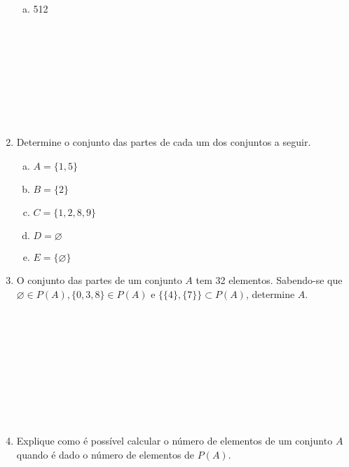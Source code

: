 \documentclass[a4paper,14pt]{article}
\begin{document}
\begin{multicols}{2}
\begin{enumerate}
\begin{enumerate}[a)]
   				\item 512 \\\\\\\\\\\\\\\\\\
   			\end{enumerate}
   			\item Determine o conjunto das partes de cada um dos conjuntos a seguir.
   			\begin{enumerate}[a)]
   				\item $A = \{1, 5\}$
   				\item $B = \{2\}$
   				\item $C = \{1, 2, 8, 9\}$
   				\item $D = \varnothing$
   				\item $E = \{\varnothing\}$
   			\end{enumerate}
   			\item O conjunto das partes de um conjunto $A$ tem 32 elementos. Sabendo-se que $\varnothing \in P(A), \{0, 3, 8\} \in P(A)$ e $\{\{4\},\{7\}\} \subset P(A)$, determine $A$. \\\\\\\\\\\\\\\\\\\\
   			\item Explique como é possível calcular o número de elementos de um conjunto $A$ quando é dado o número de elementos de $P(A)$.
	    \end{enumerate}
        $~$ \\ $~$ \\ $~$ \\ $~$ \\ $~$ \\ $~$ \\ $~$ \\ $~$ \\ $~$ \\ $~$
	\end{multicols}
\end{document}
